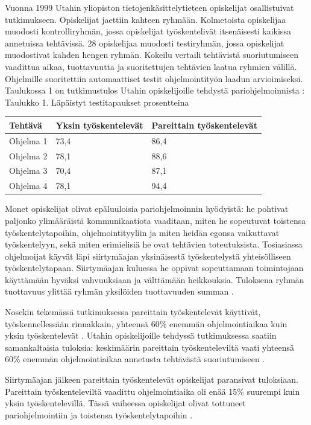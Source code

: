 \documentclass[finnish]{tktltiki2}
\theoremstyle{definition}
\theoremstyle{remark}
\begin{document}
{Vuonna 1999 Utahin yliopiston tietojenkäsittelytieteen opiskelijat osallistuivat tutkimukseen. Opiskelijat jaettiin kahteen ryhmään. Kolmetoista opiskelijaa muodosti kontrolliryhmän, jossa opiskelijat työskentelivät itsenäisesti kaikissa annetuissa tehtävissä. 28 opiskelijaa muodosti testiryhmän, jossa opiskelijat muodostivat kahden hengen ryhmän. Kokeilu vertaili tehtävistä suoriutumiseen vaadittua aikaa, tuottavuutta ja suoritettujen tehtävien laatua ryhmien välillä. Ohjelmille suoritettiin automaattiset testit ohjelmointityön laadun arvioimiseksi. Taulukossa 1 on tutkimustulos Utahin opiskelijoille tehdystä pariohjelmoinnista \cite{WIL00}:
Taulukko 1. Läpäistyt testitapaukset prosentteina
\begin{center}
\begin{tabular}{ | l | l | p{5cm} |}
\hline
Tehtävä & Yksin työskentelevät & Pareittain työskentelevät \\ \hline
Ohjelma 1 & 73,4 & 86,4 \\ \hline
Ohjelma 2 & 78,1 & 88,6 \\ \hline
Ohjelma 3 & 70,4 & 87,1 \\ \hline
Ohjelma 4 & 78,1 & 94,4 \\ \hline
\end{tabular}
\end{center}

Monet opiskelijat olivat epäluuloisia pariohjelmoinnin hyödyistä: he pohtivat paljonko ylimääräistä kommunikaatiota vaaditaan, miten he sopeutuvat toistensa työskentelytapoihin, ohjelmointityyliin ja miten heidän egonsa vaikuttavat työskentelyyn, sekä miten erimielisiä he ovat tehtävien toteutuksista. Tosiasiassa ohjelmoijat käyvät läpi siirtymäajan yksinäisestä työskentelystä yhteisölliseen työskentelytapaan. Siirtymäajan kuluessa he oppivat sopeuttamaan toimintojaan käyttämään hyväksi vahvuuksiaan ja välttämään heikkouksia. Tuloksena ryhmän tuottavuus ylittää ryhmän yksilöiden tuottavuuden summan \cite{WIL00}.

Nosekin tekemässä tutkimuksessa pareittain työskentelevät käyttivät, työskennellessään rinnakkain, yhteensä 60\% enemmän ohjelmointiaikaa kuin yksin työskentelevät \cite{NOS98}. Utahin opiskelijoille tehdyssä tutkimuksessa saatiin samankaltaisia tuloksia: keskimäärin pareittain työskenteleviltä vaati yhteensä 60\% enemmän ohjelmointiaikaa annetusta tehtävästä suoriutumiseen \cite{WIL00}.

Siirtymäajan jälkeen pareittain työskentelevät opiskelijat paransivat tuloksiaan. Pareittain työskenteleviltä vaadittu ohjelmointiaika oli enää 15\% suurempi kuin yksin työskentelevillä. Tässä vaiheessa opiskelijat olivat tottuneet pariohjelmointiin ja toistensa työskentelytapoihin \cite{WIL00}.

}
\end{document}
